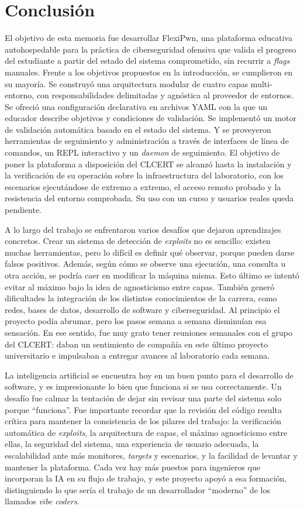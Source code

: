 \chapter{Conclusión}

El objetivo de esta memoria fue desarrollar FlexiPwn, una plataforma educativa
autohospedable para la práctica de ciberseguridad ofensiva que valida el
progreso del estudiante a partir del estado del sistema comprometido, sin
recurrir a \textit{flags} manuales. Frente a los objetivos propuestos en la
introducción, se cumplieron en su mayoría. Se construyó una arquitectura modular
de cuatro capas multi-entorno, con responsabilidades delimitadas y agnóstica al
proveedor de entornos. Se ofreció una configuración declarativa en archivos
YAML con la que un educador describe objetivos y condiciones de validación. Se
implementó un motor de validación automática basado en el estado del sistema. Y
se proveyeron herramientas de seguimiento y administración a través de
interfaces de línea de comandos, un REPL interactivo y un \textit{daemon} de
seguimiento. El objetivo de poner la plataforma a disposición del CLCERT se
alcanzó hasta la instalación y la verificación de su operación sobre la
infraestructura del laboratorio, con los escenarios ejecutándose de extremo a
extremo, el acceso remoto probado y la resistencia del entorno comprobada. Su uso con 
un curso y usuarios reales queda pendiente.

A lo largo del trabajo se enfrentaron varios desafíos que dejaron aprendizajes
concretos. Crear un sistema de detección de \textit{exploits} no es sencillo:
existen
muchas herramientas, pero lo difícil es definir qué observar, porque pueden
darse falsos positivos. Además, según cómo se observe una ejecución, una
consulta u otra acción, se podría caer en modificar la máquina misma. Esto
último se intentó evitar al máximo bajo la idea de agnosticismo entre capas.
También generó dificultades la integración de los distintos conocimientos de la
carrera, como redes, bases de datos, desarrollo de software y ciberseguridad. Al
principio el proyecto podía abrumar, pero los pasos semana a semana disminuían
esa sensación. En ese sentido, fue muy grato tener reuniones semanales con el
grupo del CLCERT: daban un sentimiento de compañía en este último proyecto
universitario e impulsaban a entregar avances al laboratorio cada semana.

La inteligencia artificial se encuentra hoy en un buen punto para el desarrollo
de software, y es impresionante lo bien que funciona si se usa correctamente. Un
desafío fue calmar la tentación de dejar sin revisar una parte del sistema solo
porque ``funciona''. Fue importante recordar que la revisión del código resulta
crítica para mantener la consistencia de los pilares del trabajo: la
verificación automática de \textit{exploits}, la arquitectura de capas, el
máximo agnosticismo entre ellas, la seguridad del sistema, una experiencia de
usuario adecuada, la escalabilidad ante más monitores, \textit{targets} y
escenarios, y
la facilidad de levantar y mantener la plataforma. Cada vez hay más puestos para
ingenieros que incorporan la IA en su flujo de trabajo, y este proyecto apoyó
a esa formación, distinguiendo lo que sería el trabajo de 
un desarrollador ``moderno'' de los llamados \textit{vibe coders}.

